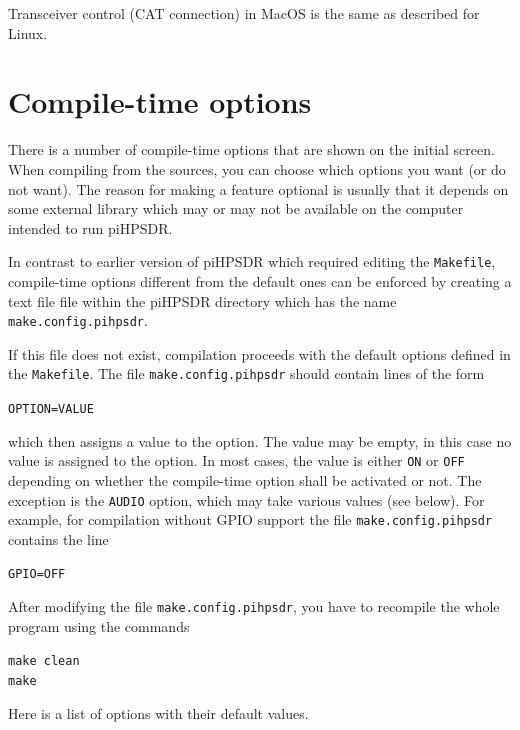 \documentclass[12pt]{book}
\def\grtt#1{\texttt{\color{magenta}#1}}
\def\pH{pi\-HPSDR\xspace}
\begin{document}
Transceiver control (CAT connection) in MacOS is the same as described for Linux.

\chapter{Compile-time options}
\label{sec:compiletime}

There is a number of compile-time options that are shown on the initial screen.
When compiling from the sources, you can choose which options you want (or do not want).
The reason for making a feature optional is usually that it depends on some external
library which may or may not be available on the computer intended  to run \pH.

In contrast to earlier version of \pH which required editing the \texttt{Makefile},
compile-time options different from the default ones can be enforced by
creating a text file
file within the \pH directory which has the name \grtt{make.config.pihpsdr}.

If this file does not exist, compilation proceeds with the default options defined
in the \texttt{Makefile}.  The file
\grtt{make.config.pihpsdr} should contain lines of the form

\texttt{OPTION=VALUE}

which then assigns a value to the option. The value may be empty, in this case no value is assigned
to the option. In most cases, the value is either \texttt{ON} or \texttt{OFF} depending on whether
the compile-time option shall be activated or not.
The exception is the \texttt{AUDIO} option, which may take various values
(see below). For example, for compilation without GPIO support the file \grtt{make.config.pihpsdr}
contains the line

\texttt{GPIO=OFF}

After modifying the file \grtt{make.config.pihpsdr}, you have to recompile the
whole program using the commands


\grtt{make clean} \\
\grtt{make}


Here is a list of options with their default values.
\end{document}
